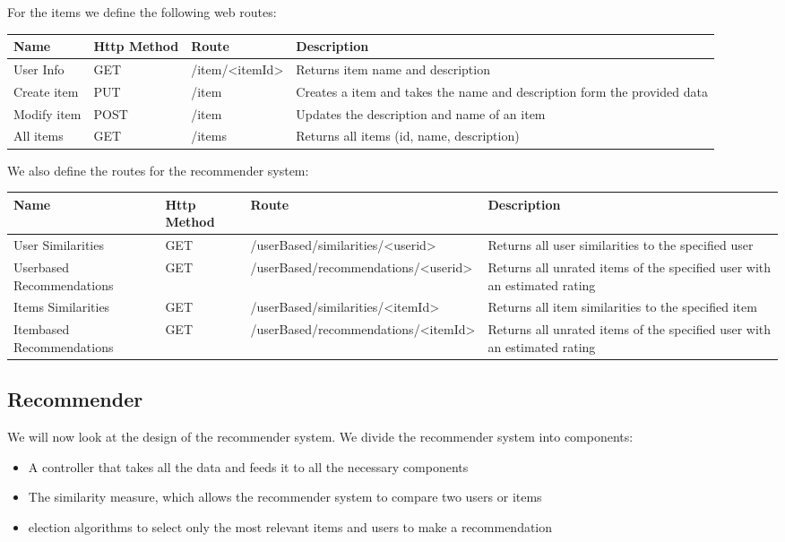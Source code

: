 For the items we define the following web routes:

\begin{longtable}{|p{2.5cm}|p{2.5cm}|p{3.2cm}|p{5cm}|}
    \hline
	  Name & Http Method & Route & Description \\
    \hline
    \hline
    User Info & GET & /item/<itemId> & Returns item name and description\\
    \hline
    Create item & PUT & /item & Creates a item and takes the name and description form the provided data\\
    \hline
    Modify item & POST & /item & Updates the description and name of an item\\
    \hline
    All items & GET & /items & Returns all items (id, name, description)\\
    \hline
\end{longtable}

We also define the routes for the recommender system:

\begin{longtable}{|p{2.5cm}|p{2.5cm}|p{3.2cm}|p{5cm}|}
    \hline
	  Name & Http Method & Route & Description \\
    \hline
    \hline
    User Similarities & GET & /userBased/\allowbreak similarities/\allowbreak<userid> & Returns all user similarities to the specified user\\
    \hline
    Userbased Recommendations & GET & /userBased/\allowbreak recommendations/\allowbreak<userid> & Returns all unrated items of the specified user with an estimated rating\\
    \hline
    Items Similarities & GET & /userBased/\allowbreak similarities/\allowbreak<itemId> & Returns all item similarities to the specified item\\
    \hline
    Itembased Recommendations & GET & /userBased/\allowbreak recommendations/\allowbreak <itemId> & Returns all unrated items of the specified user with an estimated rating\\
    \hline
\end{longtable}

\subsection{Recommender}

We will now look at the design of the recommender system. We divide the recommender system into components: 

\begin{itemize}
    \item A controller that takes all the data and feeds it to all the necessary components
    \item The similarity measure, which allows the recommender system to compare two users or items
    \item election algorithms to select only the most relevant items and users to make a recommendation
\end{itemize}

